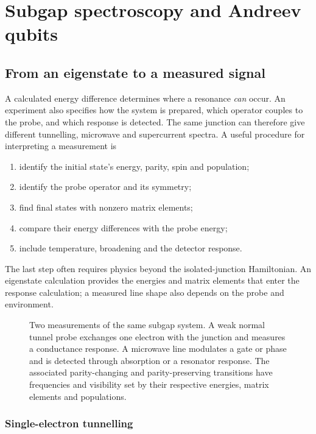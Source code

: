 \chapter{Subgap spectroscopy and Andreev qubits}\label{ch:experiments}

\section{From an eigenstate to a measured signal}\label{sec:measurement-picture}

A calculated energy difference determines where a resonance \emph{can} occur. An
experiment also specifies how the system is prepared, which operator couples to
the probe, and which response is detected. The same junction can therefore give
different tunnelling, microwave and supercurrent spectra. A useful procedure
for interpreting a measurement is
\begin{enumerate}
\item identify the initial state's energy, parity, spin and population;
\item identify the probe operator and its symmetry;
\item find final states with nonzero matrix elements;
\item compare their energy differences with the probe energy;
\item include temperature, broadening and the detector response.
\end{enumerate}
The last step often requires physics beyond the isolated-junction Hamiltonian.
An eigenstate calculation provides the energies and matrix elements that enter
the response calculation; a measured line shape also depends on the probe and environment.

\begin{figure}[htb]
\centering{}
\caption{Two measurements of the same subgap system. A weak normal tunnel probe
exchanges one electron with the junction and measures a conductance response.
A microwave line modulates a gate or phase and is detected through absorption
or a resonator response. The associated parity-changing and parity-preserving
transitions have frequencies and visibility set by their respective energies, matrix elements and populations.}
\label{fig:primer-probes}
\end{figure}

\subsection{Single-electron tunnelling}

